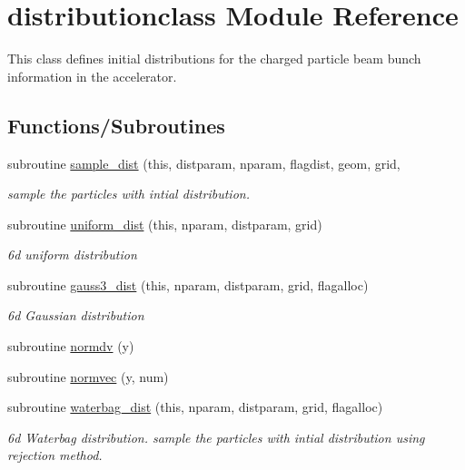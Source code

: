 \hypertarget{namespacedistributionclass}{}\section{distributionclass Module Reference}
\label{namespacedistributionclass}


This class defines initial distributions for the charged particle beam bunch information in the accelerator.  


\subsection*{Functions/\+Subroutines}
\begin{DoxyCompactItemize}
\item 
subroutine \mbox{\hyperlink{namespacedistributionclass_aee8dd99a29887ed3860bcce7adb87ce8}{sample\+\_\+dist}} (this, distparam, nparam, flagdist, geom, grid,
\begin{DoxyCompactList}\small\item\em sample the particles with intial distribution. \end{DoxyCompactList}\item 
subroutine \mbox{\hyperlink{namespacedistributionclass_a5e52f4e8f1be5bbedde152f2263e74af}{uniform\+\_\+dist}} (this, nparam, distparam, grid)
\begin{DoxyCompactList}\small\item\em 6d uniform distribution \end{DoxyCompactList}\item 
subroutine \mbox{\hyperlink{namespacedistributionclass_af85f956a3fdb677022a546bc69ecfb3c}{gauss3\+\_\+dist}} (this, nparam, distparam, grid, flagalloc)
\begin{DoxyCompactList}\small\item\em 6d Gaussian distribution \end{DoxyCompactList}\item 
subroutine \mbox{\hyperlink{namespacedistributionclass_a00377c8aa90fa9dc8b222d71d019f936}{normdv}} (y)
\item 
subroutine \mbox{\hyperlink{namespacedistributionclass_acfc04ca0c8be3e0f3e73779c5e88693b}{normvec}} (y, num)
\item 
subroutine \mbox{\hyperlink{namespacedistributionclass_aed734df6d00f7004cf11847adb42dd1d}{waterbag\+\_\+dist}} (this, nparam, distparam, grid, flagalloc)
\begin{DoxyCompactList}\small\item\em 6d Waterbag distribution. sample the particles with intial distribution using rejection method. \end{DoxyCompactList}\item 

\end{DoxyCompactItemize}
